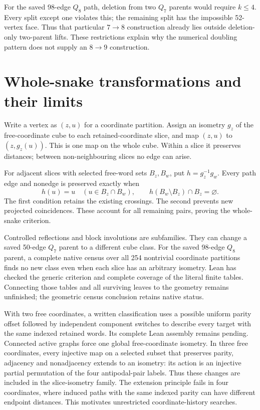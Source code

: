 \documentclass[11pt,a4paper]{article}
\begin{document}
For the saved 98-edge $Q_8$ path, deletion from two $Q_7$ parents would
require $k\le4$. Every split except one violates this; the remaining
split has the impossible 52-vertex face. Thus that particular
$7\to8$ construction already lies outside deletion-only two-parent lifts.
These restrictions explain why the numerical doubling pattern does not
supply an $8\to9$ construction.

\section{Whole-snake transformations and their limits}
Write a vertex as $(z,u)$ for a coordinate partition. Assign an
isometry $g_z$ of the free-coordinate cube to each retained-coordinate
slice, and map $(z,u)$ to $(z,g_z(u))$. This is one map on the whole
cube. Within a slice it preserves distances; between non-neighbouring
slices no edge can arise.

For adjacent slices with selected free-word sets $B_z,B_w$, put
$h=g_z^{-1}g_w$. Every path edge and nonedge is preserved exactly when
\[
h(u)=u\quad(u\in B_z\cap B_w),\qquad
h(B_w\setminus B_z)\cap B_z=\varnothing.
\]
The first condition retains the existing crossings. The second
prevents new projected coincidences. These account for all remaining
pairs, proving the whole-snake criterion.

Controlled reflections and block involutions are subfamilies.
They can change a saved 50-edge $Q_7$ parent to a different cube class.
For the saved 98-edge $Q_8$ parent, a complete native census over all
254 nontrivial coordinate partitions finds no new class even when
each slice has an arbitrary isometry. Lean has checked the generic
criterion and complete coverage of the literal finite tables.
Connecting those tables and all surviving leaves to the geometry
remains unfinished; the geometric census conclusion retains native status.

With two free coordinates, a written classification uses a possible
uniform parity offset followed by independent component switches to
describe every target with the same indexed retained words. Its complete
Lean assembly remains pending. Connected active graphs force one global
free-coordinate isometry. In three free coordinates, every injective
map on a selected subset that preserves parity, adjacency and nonadjacency
extends to an isometry: its action is an injective partial permutation
of the four antipodal-pair labels. Thus these changes are included in
the slice-isometry family. The extension principle fails in four
coordinates, where induced paths with the same indexed parity can
have different endpoint distances. This motivates unrestricted
coordinate-history searches.
\end{document}
